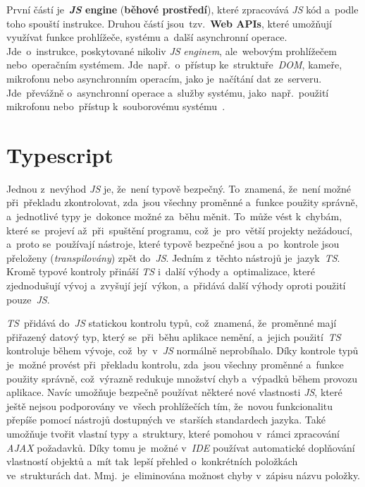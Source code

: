 \documentclass[11pt,a4paper]{report}
\let\oldacrshort\acrshort
\renewcommand{\acrshort}[1]{\emph{\normalsize\color[rgb]{0,0,0}\noindent\oldacrshort{#1}}}
\begin{document}
            První částí je~\textbf{\acrshort{JS} engine} (\textbf{běhové prostředí}), které zpracovává \acrshort{JS} kód a~podle toho spouští instrukce. Druhou částí jsou~tzv.~\textbf{Web APIs}, které umožňují využívat funkce prohlížeče, systému a~další {asynchronní} operace. Jde~o~instrukce, poskytované nikoliv \acrshort{JS} \emph{enginem}, ale~webovým prohlížečem nebo~operačním systémem. Jde~např.~o~přístup ke~struktuře~\acrshort{DOM}, kameře, mikrofonu nebo asynchronním operacím, jako je~načítání dat ze~serveru. Jde~převážně o~asynchronní operace a~služby systému, jako~např.~použití mikrofonu nebo~přístup k~souborovému systému~\cite{kantor_javascript}.

        \section{Typescript}
            Jednou z~nevýhod \acrshort{JS} je, že~není typově bezpečný. To~znamená, že~není možné při~překladu zkontrolovat, zda~jsou všechny proměnné a~funkce použity správně, a~jednotlivé typy je~dokonce možné za~běhu měnit. To~může vést k~chybám, které se~projeví až~při~spuštění programu, což~je~pro~větší projekty nežádoucí, a~proto se~používají nástroje, které typově bezpečné jsou a~po~kontrole jsou přeloženy (\emph{transpilovány}) zpět do~\acrshort{JS}. Jedním z~těchto nástrojů je~jazyk~\acrshort{TS}. Kromě typové kontroly přináší \acrshort{TS} i~další výhody a~optimalizace, které zjednodušují vývoj a~zvyšují její~výkon, a~přidává další výhody oproti použití pouze~\acrshort{JS}.

            \acrshort{TS}~přidává do~\acrshort{JS} statickou kontrolu typů, což~znamená, že~proměnné mají přiřazený datový typ, který se~při~běhu aplikace nemění, a~jejich použití~\acrshort{TS} kontroluje během vývoje, což~by~v~\acrshort{JS} normálně neprobíhalo. Díky kontrole typů je~možné provést při~překladu kontrolu, zda~jsou všechny proměnné a~funkce použity správně, což~výrazně redukuje množství chyb a~výpadků během provozu aplikace. Navíc umožňuje bezpečně používat některé nové vlastnosti \acrshort{JS}, které ještě nejsou podporovány ve~všech prohlížečích tím, že~novou funkcionalitu přepíše pomocí nástrojů dostupných ve~starších standardech jazyka. Také umožňuje tvořit vlastní typy a~struktury, které pomohou v~rámci zpracování \acrshort{AJAX} požadavků. Díky tomu je~možné v~\acrshort{IDE} používat automatické doplňování vlastností objektů a~mít tak~lepší přehled o~konkrétních položkách ve~strukturách dat. Mmj.~je~eliminována možnost chyby v~zápisu názvu položky.
\end{document}
